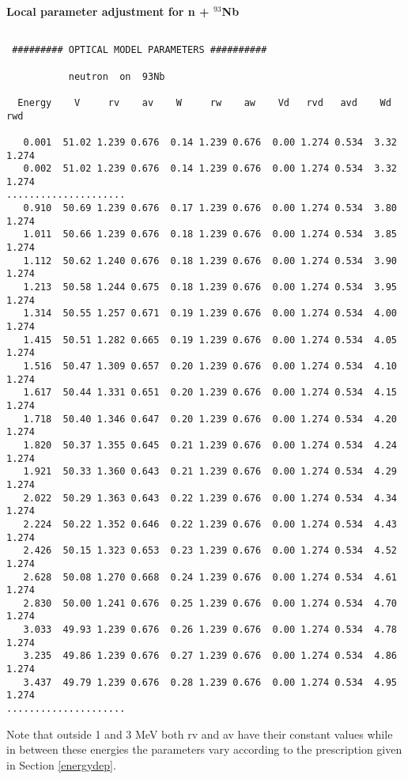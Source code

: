 \begin{samplecase}
{\bf Local parameter adjustment for n + ${}^{93}$Nb}\newline


{\small \begin{verbatim}

 ######### OPTICAL MODEL PARAMETERS ##########

           neutron  on  93Nb

  Energy    V     rv    av    W     rw    aw    Vd   rvd   avd    Wd   rwd 

   0.001  51.02 1.239 0.676  0.14 1.239 0.676  0.00 1.274 0.534  3.32 1.274
   0.002  51.02 1.239 0.676  0.14 1.239 0.676  0.00 1.274 0.534  3.32 1.274
.....................
   0.910  50.69 1.239 0.676  0.17 1.239 0.676  0.00 1.274 0.534  3.80 1.274
   1.011  50.66 1.239 0.676  0.18 1.239 0.676  0.00 1.274 0.534  3.85 1.274
   1.112  50.62 1.240 0.676  0.18 1.239 0.676  0.00 1.274 0.534  3.90 1.274
   1.213  50.58 1.244 0.675  0.18 1.239 0.676  0.00 1.274 0.534  3.95 1.274
   1.314  50.55 1.257 0.671  0.19 1.239 0.676  0.00 1.274 0.534  4.00 1.274
   1.415  50.51 1.282 0.665  0.19 1.239 0.676  0.00 1.274 0.534  4.05 1.274
   1.516  50.47 1.309 0.657  0.20 1.239 0.676  0.00 1.274 0.534  4.10 1.274
   1.617  50.44 1.331 0.651  0.20 1.239 0.676  0.00 1.274 0.534  4.15 1.274
   1.718  50.40 1.346 0.647  0.20 1.239 0.676  0.00 1.274 0.534  4.20 1.274
   1.820  50.37 1.355 0.645  0.21 1.239 0.676  0.00 1.274 0.534  4.24 1.274
   1.921  50.33 1.360 0.643  0.21 1.239 0.676  0.00 1.274 0.534  4.29 1.274
   2.022  50.29 1.363 0.643  0.22 1.239 0.676  0.00 1.274 0.534  4.34 1.274
   2.224  50.22 1.352 0.646  0.22 1.239 0.676  0.00 1.274 0.534  4.43 1.274
   2.426  50.15 1.323 0.653  0.23 1.239 0.676  0.00 1.274 0.534  4.52 1.274
   2.628  50.08 1.270 0.668  0.24 1.239 0.676  0.00 1.274 0.534  4.61 1.274
   2.830  50.00 1.241 0.676  0.25 1.239 0.676  0.00 1.274 0.534  4.70 1.274
   3.033  49.93 1.239 0.676  0.26 1.239 0.676  0.00 1.274 0.534  4.78 1.274
   3.235  49.86 1.239 0.676  0.27 1.239 0.676  0.00 1.274 0.534  4.86 1.274
   3.437  49.79 1.239 0.676  0.28 1.239 0.676  0.00 1.274 0.534  4.95 1.274
.....................
\end{verbatim} } \renewcommand{\baselinestretch}{1.07}\small\normalsize
\noindent
Note that outside 1 and 3 MeV both rv and av have their constant values while in 
between these energies the parameters vary according to the prescription given in 
Section \ref{energydep}.
\end{samplecase}
